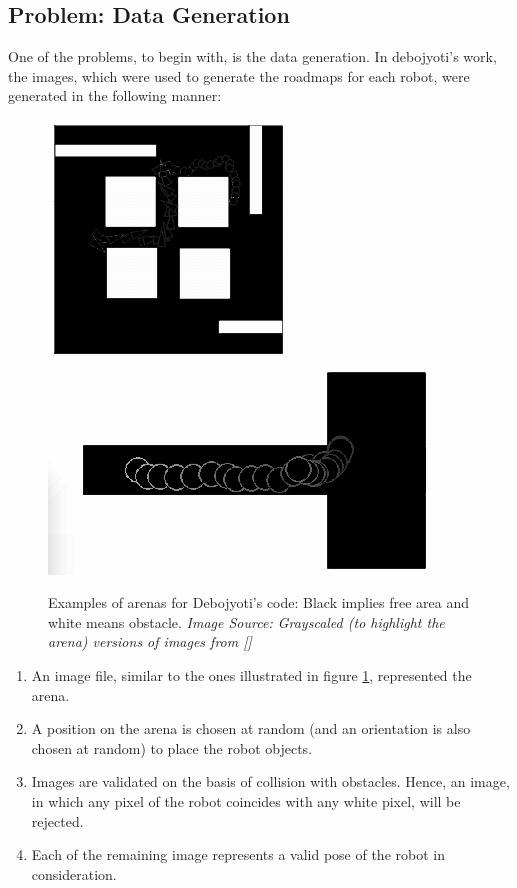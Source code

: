 \documentclass[12pt]{article}
\begin{document}
\subsection{Problem: Data Generation}
One of the problems, to begin with, is the data generation. In debojyoti's work, the images, which were used to generate the roadmaps for each robot, were generated in the following manner:
\begin{figure}
  \includegraphics[width=0.5\columnwidth]{graphics/exp1_deb}
  \includegraphics[width=0.5\columnwidth]{graphics/exp2_deb}
  \caption{Examples of arenas for Debojyoti's code: Black implies free area and white means obstacle. \textit{Image Source: Grayscaled (to highlight the arena) versions of images from [\cite{deb}]}}
  \label{twoD_arenas}
\end{figure}
\begin{enumerate}
  \item An image file, similar to the ones illustrated in figure \ref{twoD_arenas}, represented the arena.
  \item A position on the arena is chosen at random (and an orientation is also chosen at random) to place the robot objects.
  \item Images are validated on the basis of collision with obstacles. Hence, an image, in which any pixel of the robot coincides with any white pixel, will be rejected.
  \item Each of the remaining image represents a valid pose of the robot in consideration.
\end{enumerate}
\end{document}
